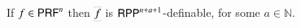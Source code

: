 \begin{theorem}
\label{theorem:RPP is PRF-complete}
If $ f\in\mathsf{P}\mathsf{RF}^n $ then $ \prrpr{f}$ is $ \mathsf{RPP}^{n+a+1} $-definable, for some $a\in\mathbb{N}$.
\end{theorem}
